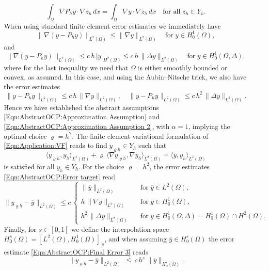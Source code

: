 \documentclass{article}
\numberwithin{equation}{section}
\begin{document}
\[
  \int_\Omega \nabla P_h y \cdot \nabla z_h \, dx =
  \int_\Omega \nabla y \cdot \nabla z_h \, dx \quad
  \mbox{for all} \; z_h \in Y_h .
\]
When using standard finite element error estimates we immediately
have
\[
  \| \nabla (y-P_hy) \|_{L^2(\Omega)} \leq \| \nabla y \|_{L^2(\Omega)}
  \quad \mbox{for} \; y \in H^1_0(\Omega),
\]
and
\[
  \| \nabla (y-P_hy) \|_{L^2(\Omega)} \leq c \, h \, |y|_{H^2(\Omega)} \leq
  c \, h \, \| \Delta y \|_{L^2(\Omega)} \quad
  \mbox{for} \; y \in H^1_0(\Omega,\Delta),
\]
where for the last inequality we need that $\Omega$ is either smoothly
bounded or convex, as assumed. In this case, and using the
Aubin--Nitsche trick, we also have the error estimates
\[
  \| y - P_h y \|_{L^2(\Omega)} \leq
  c \, h \, \| \nabla y \|_{L^2(\Omega)}, \quad
  \| y - P_h y \|_{L^2(\Omega)} \leq
  c \, h^2 \, \| \Delta y \|_{L^2(\Omega)}.
\]
Hence we have established the abstract assumptions
\eqref{Eqn:AbstractOCP:Approximation Assumption} and
\eqref{Eqn:AbstractOCP:Approximation Assumption 2}, with $\mbox{$\alpha=1$}$,
implying the optimal choice $\varrho = h^2$.
The finite element variational formulation of
\eqref{Eqn:Application:VF} reads to find $y_{\varrho h} \in Y_h$ such that
%
\begin{equation}
\label{Eqn:Application:FEM}
  \langle y_{\varrho h} , y_h \rangle_{L^2(\Omega)} +
  \varrho \, \langle \nabla y_{\varrho h} , \nabla y_h \rangle_{L^2(\Omega)}
  =
  \langle \overline{y} , y_h \rangle_{L^2(\Omega)}
\end{equation}
is satisfied for all $y_h \in Y_h$. 
%
For the choice $\varrho = h^2$, the error
estimates \eqref{Eqn:AbstractOCP:Error target} read
\[
   \| y_{\varrho h} - \overline{y} \|_{L^2(\Omega)} \leq c \, \left \{
      \begin{array}{ccl}
        \| \overline{y} \|_{L^2(\Omega)}
        & & \mbox{for} \; \overline{y} \in L^2(\Omega), \\[2mm]
        h \, \| \nabla \overline{y} \|_{L^2(\Omega)}
        & & \mbox{for} \; \overline{y} \in H^1_0(\Omega), \\[2mm]
        h^2 \, \| \Delta \overline{y} \|_{L^2(\Omega)}
        && \mbox{for} \; \overline{y} \in H^1_0(\Omega,\Delta) =
           H^1_0(\Omega) \cap H^2(\Omega) .
      \end{array} \right.
\]
Finally, for $s \in [0,1]$ we define the interpolation space
$H^s_0(\Omega) = [L^2(\Omega),H^1_0(\Omega)]_{|s}$, 
and when assuming $\overline{y} \in H^s_0(\Omega)$ the error estimate
\eqref{Eqn:AbstractOCP:Final Error 3} reads
%
\begin{equation}
\label{Eqn:Application:ErrorEstimateH^s}
  \| y_{\varrho h} - \overline{y} \|_{L^2(\Omega)} \, \leq \,
  c \, h^s \, \| \overline{y} \|_{H^s_0(\Omega)} .
\end{equation}
\end{document}
